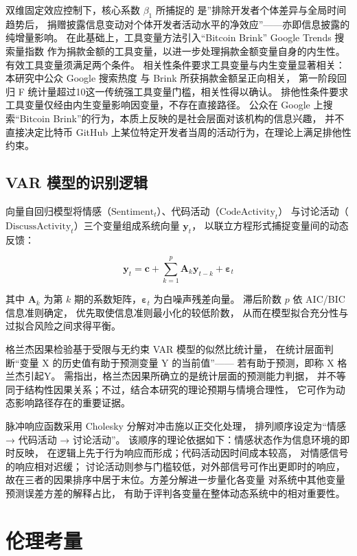 双维固定效应控制下，核心系数 $\beta_1$ 所捕捉的
是”排除开发者个体差异与全局时间趋势后，
捐赠披露信息变动对个体开发者活动水平的净效应”——亦即信息披露的纯增量影响。
在此基础上，工具变量方法引入“Bitcoin Brink” Google Trends 搜索量指数
作为捐款金额的工具变量，以进一步处理捐款金额变量自身的内生性。
有效工具变量须满足两个条件。
相关性条件要求工具变量与内生变量显著相关：本研究中公众 Google 搜索热度
与 Brink 所获捐款金额呈正向相关，
第一阶段回归 F 统计量超过10这一传统强工具变量门槛，相关性得以确认。
排他性条件要求工具变量仅经由内生变量影响因变量，不存在直接路径。
公众在 Google 上搜索“Bitcoin Brink”的行为，本质上反映的是社会层面对该机构的信息兴趣，
并不直接决定比特币 GitHub 上某位特定开发者当周的活动行为，在理论上满足排他性约束。

\subsection{VAR 模型的识别逻辑}

向量自回归模型将情感（$\text{Sentiment}_t$）、代码活动（$\text{CodeActivity}_t$）
与讨论活动（$\text{DiscussActivity}_t$）三个变量组成系统向量 $\mathbf{y}_t$，
以联立方程形式捕捉变量间的动态反馈：

\begin{equation}
\label{eq:var-overview}
\mathbf{y}_t = \mathbf{c} + \sum_{k=1}^{p} \mathbf{A}_k \mathbf{y}_{t-k} + \boldsymbol{\varepsilon}_t
\end{equation}

其中 $\mathbf{A}_k$ 为第 $k$ 期的系数矩阵，$\boldsymbol{\varepsilon}_t$ 为白噪声残差向量。
滞后阶数 $p$ 依 AIC/BIC 信息准则确定，
优先取使信息准则最小化的较低阶数，
从而在模型拟合充分性与过拟合风险之间求得平衡。

格兰杰因果检验基于受限与无约束 VAR 模型的似然比统计量，
在统计层面判断“变量 X 的历史值有助于预测变量 Y 的当前值”——
若有助于预测，即称 X 格兰杰引起Y。
需指出，格兰杰因果所确立的是统计层面的预测能力判据，
并不等同于结构性因果关系；不过，结合本研究的理论预期与情境合理性，
它可作为动态影响路径存在的重要证据。

脉冲响应函数采用 Cholesky 分解对冲击施以正交化处理，
排列顺序设定为“情感 → 代码活动 → 讨论活动”。
该顺序的理论依据如下：情感状态作为信息环境的即时反映，
在逻辑上先于行为响应而形成；代码活动因时间成本较高，
对情感信号的响应相对迟缓；
讨论活动则参与门槛较低，对外部信号可作出更即时的响应，
故在三者的因果排序中居于末位。方差分解进一步量化各变量
对系统中其他变量预测误差方差的解释占比，
有助于评判各变量在整体动态系统中的相对重要性。

\section{伦理考量}

